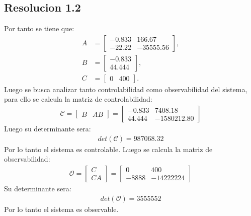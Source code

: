 \documentclass[
  11pt,
  letterpaper,
   addpoints,
   answers
  ]{exam}
\begin{document}
\begin{questions}
\begin{solution}
    \subsection{Resolucion 1.2}
    Por tanto se tiene que:
    \begin{align}
        A &=
        \begin{bmatrix}
        -0.833 & 166.67 \\
        -22.22 & -35555.56
        \end{bmatrix}, \\
        B &=
        \begin{bmatrix}
        -0.833 \\
        44.444
        \end{bmatrix}, \\
        C &=
        \begin{bmatrix}
        0 & 400
        \end{bmatrix}.
    \end{align}
    Luego se busca analizar tanto controlabilidad como observabilidad del sistema, para ello se calcula la matriz de controlabilidad:
    \begin{align}
        \mathcal{C} = \begin{bmatrix}
            B & AB
        \end{bmatrix} = \begin{bmatrix}
            -0.833 & 7408.18 \\
            44.444 & -1580212.80
        \end{bmatrix}
    \end{align}    
    Luego su determinante sera:
    \begin{align}
        det(\mathcal{C}) = 987068.32
    \end{align}
    Por lo tanto el sistema es controlable. Luego se calcula la matriz de observabilidad:
    \begin{align}
        \mathcal{O} = \begin{bmatrix}
            C \\
            CA
        \end{bmatrix} = \begin{bmatrix}
            0 & 400 \\
            -8888 & -14222224
        \end{bmatrix}
    \end{align}
    Su determinante sera:
    \begin{align}
        det(\mathcal{O}) = 3555552
    \end{align}
    Por lo tanto el sistema es observable.

\end{solution}
\end{questions}
\end{document}
